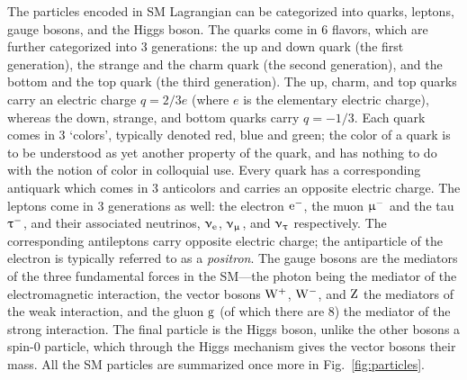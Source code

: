 The particles encoded in SM Lagrangian can be categorized into quarks, leptons, gauge bosons, and the Higgs boson.
% 
The quarks come in 6 flavors, which are further categorized into 3 generations: the up and down quark (the first generation), the strange and the charm quark (the second generation), and the bottom and the top quark (the third generation).
% 
The up, charm, and top quarks carry an electric charge $q = 2/3e$ (where $e$ is the elementary electric charge), whereas the down, strange, and bottom quarks carry $q=-1/3$.
% 
Each quark comes in 3 `colors', typically denoted red, blue and green; the color of a quark is to be understood as yet another property of the quark, and has nothing to do with the notion of color in colloquial use.
% 
Every quark has a corresponding antiquark which comes in 3 anticolors and carries an opposite electric charge.
% 
The leptons come in 3 generations as well: the electron $\mathrm{e}^-$, the muon $\upmu^-$ and the tau $\uptau^-$, and their associated neutrinos, $\upnu_\mathrm{e}$, $\upnu_\upmu$, and $\upnu_\uptau$ respectively.
% 
The corresponding antileptons carry opposite electric charge; the antiparticle of the electron is typically referred to as a \textit{positron}.
% 
The gauge bosons are the mediators of the three fundamental forces in the SM---the photon being the mediator of the electromagnetic interaction, the vector bosons $\mathrm{W}^+$, $\mathrm{W}^-$, and $\mathrm{Z}$ the mediators of the weak interaction, and the gluon $\mathrm{g}$ (of which there are 8) the mediator of the strong interaction.
% 
The final particle is the Higgs boson, unlike the other bosons a spin-0 particle, which through the Higgs mechanism gives the vector bosons their mass.
% 
All the SM particles are summarized once more in Fig.~\ref{fig:particles}.

